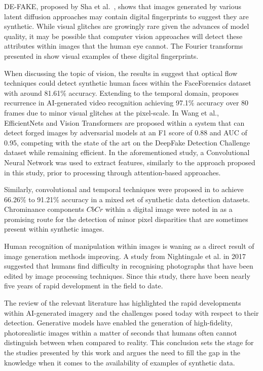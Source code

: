 \documentclass{article}
\begin{document}
DE-FAKE, proposed by Sha et al.~\cite{sha2022fake}, shows that images generated by various latent diffusion approaches may contain digital fingerprints to suggest they are synthetic. While visual glitches are growingly rare given the advances of model quality, it may be possible that computer vision approaches will detect these attributes within images that the human eye cannot. The Fourier transforms presented in \cite{corvi2022detection} show visual examples of these digital fingerprints.

When discussing the topic of vision, the results in \cite{amerini2019deepfake} suggest that optical flow techniques could detect synthetic human faces within the FaceForensics dataset with around 81.61\% accuracy. Extending to the temporal domain, \cite{guera2018deepfake} proposes recurrence in AI-generated video recognition achieving 97.1\% accuracy over 80 frames due to minor visual glitches at the pixel-scale. In Wang et al.\cite{wang2022m2tr}, EfficientNets and Vision Transformers are proposed within a system that can detect forged images by adversarial models at an F1 score of 0.88 and AUC of 0.95, competing with the state of the art on the DeepFake Detection Challenge dataset while remaining efficient. In the aforementioned study, a Convolutional Neural Network was used to extract features, similarly to the approach proposed in this study, prior to processing through attention-based approaches. 

Similarly, convolutional and temporal techniques were proposed in \cite{saikia2022hybrid} to achieve 66.26\% to 91.21\% accuracy in a mixed set of synthetic data detection datasets. Chrominance components $CbCr$ within a digital image were noted in \cite{li2020identification} as a promising route for the detection of minor pixel disparities that are sometimes present within synthetic images.

Human recognition of manipulation within images is waning as a direct result of image generation methods improving. A study from Nightingale et al.\cite{nightingale2017can} in 2017 suggested that humans find difficulty in recognising photographs that have been edited by image processing techniques. Since this study, there have been nearly five years of rapid development in the field to date. 

The review of the relevant literature has highlighted the rapid developments within AI-generated imagery and the challenges posed today with respect to their detection. Generative models have enabled the generation of high-fidelity, photorealistic images within a matter of seconds that humans often cannot distinguish between when compared to reality. This conclusion sets the stage for the studies presented by this work and argues the need to fill the gap in the knowledge when it comes to the availability of examples of synthetic data. 
\end{document}
